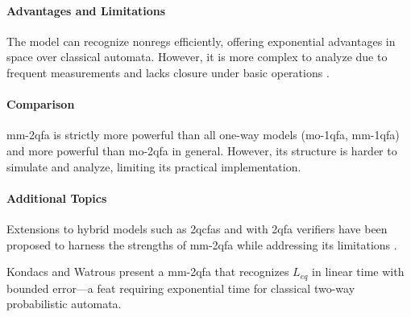 \paragraph{Advantages and Limitations} The model can recognize non\glspl{reg} efficiently, offering exponential advantages in space over classical automata. However, it is more complex to analyze due to frequent measurements and lacks closure under basic operations \cite{kondacs1997power, qiu2008state}.

\paragraph{Comparison} \gls{mm-2qfa} is strictly more powerful than all one-way models (\gls{mo-1qfa}, \gls{mm-1qfa}) and more powerful than \gls{mo-2qfa} in general. However, its structure is harder to simulate and analyze, limiting its practical implementation.

\paragraph{Additional Topics} Extensions to hybrid models such as \glspl{2qcfa} and  with \gls{2qfa} verifiers have been proposed to harness the strengths of \gls{mm-2qfa} while addressing its limitations \cite{pani2011empowering, qiu2008state}.

\begin{example}
    Kondacs and Watrous \cite{kondacs1997power} present a \gls{mm-2qfa} that recognizes $L_{eq}$ in linear time with bounded error—a feat requiring exponential time for classical two-way probabilistic automata.
\end{example}
